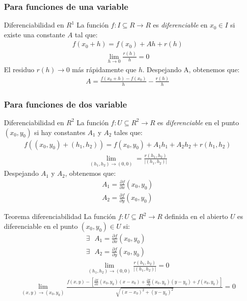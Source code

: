 \documentclass[a4paper, twoside]{article}
\numberwithin{equation}{section}
\numberwithin{figure}{section}
\numberwithin{table}{section}
\begin{document}
\subsubsection{Para funciones de una variable} 
\begin{definicion*}{Diferenciabilidad en $R^1$}
	La función $f: I \subseteq R \rightarrow R$ es \emph{diferenciable} en $x_0 \in I$ si existe una constante $A$ tal que:
	\begin{align}
		f(x_0+h)=f(x_0)+Ah+r(h)
	\end{align}
	\begin{align}
		\lim_{h \to 0}\frac{r(h)}{h}=0
	\end{align}
	El residuo $r(h) \to 0$ más rápidamente que $h$. Despejando A, obtenemos que:
	\begin{align}
		A=\frac{f(x_0+h)-f(x_0)}{h}-\frac{r(h)}{h}
	\end{align}
\end{definicion*}

\subsubsection{Para funciones de dos variable} 
\begin{definicion*}{Diferenciabilidad en $R^2$}
	La función $f:U\subseteq R^2 \rightarrow R$ es \emph{diferenciable} en el punto $(x_0,y_0)$ si hay constantes $A_1$ y $A_2$ tales que:
	\begin{align}
		f((x_0,y_0)+(h_1,h_2))=f(x_0,y_0)+A_1h_1+A_2h_2+r(h_1,h_2)
	\end{align}
	\begin{align}
		\lim_{(h_1,h_2)\rightarrow(0,0)}=\frac{r(h_1,h_2)}{|(h_1,h_2)|}
	\end{align}
	Despejando $A_1$ y $A_2$, obtenemos que:
	\begin{align}
		A_1=\frac{\partial f}{\partial x}(x_0,y_0) \\
		A_2=\frac{\partial f}{\partial y}(x_0,y_0)
	\end{align}
\end{definicion*}

\begin{teorema*}{Teorema diferenciabilidad}
	La función $f: U \subseteq R^2 \rightarrow R$ definida en el abierto $U$ es diferenciable en el punto $(x_0,y_0) \in U$ si:
	\begin{align}
		\exists \text{ } A_1=\frac{\partial f}{\partial x}(x_0,y_0) \\
		\exists \text{ } A_2=\frac{\partial f}{\partial y}(x_0,y_0) \\
		\lim_{(h_1,h_2) \to (0,0)}\frac{r(h_1,h_2)}{|(h_1,h_2)|}=0
	\end{align}
	\begin{align}
		\lim_{(x,y) \to (x_0,y_0)} \frac{f(x,y)-\left[\frac{\partial f}{\partial x}(x_0,y_0)(x-x_0)+\frac{\partial f}{\partial y}(x_0,y_0)(y-y_0)+f(x_0,y_0)\right]}{\sqrt{(x-x_0)^{2}+(y-y_0)^{2}}}=0
	\end{align}
\end{teorema*}
\end{document}
